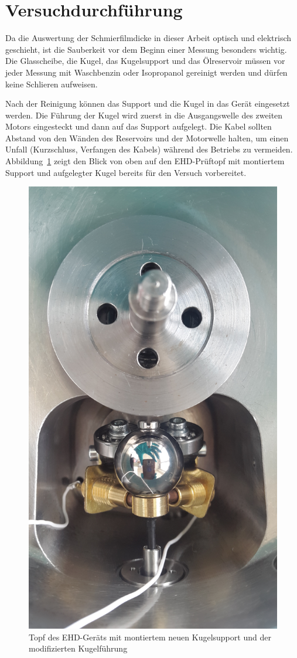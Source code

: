 \section{Versuchdurchführung}
\label{sec:versuchdurchfuehrung}

Da die Auswertung der Schmierfilmdicke in dieser Arbeit optisch und elektrisch geschieht, ist die Sauberkeit vor dem Beginn einer Messung besonders wichtig.
Die Glasscheibe, die Kugel, das Kugelsupport und das Ölreservoir müssen vor jeder Messung mit Waschbenzin oder Isopropanol gereinigt werden und dürfen keine Schlieren aufweisen.

Nach der Reinigung können das Support und die Kugel in das Gerät eingesetzt werden.
Die Führung der Kugel wird zuerst in die Ausgangswelle des zweiten Motors eingesteckt und dann auf das Support aufgelegt.
Die Kabel sollten Abstand von den Wänden des Reservoirs und der Motorwelle halten, um einen Unfall (Kurzschluss, Verfangen des Kabels) während des Betriebs zu vermeiden.
Abbildung~\ref{fig:ehd_topf_mit_kugel_und_support} zeigt den Blick von oben auf den EHD-Prüftopf mit montiertem Support und aufgelegter Kugel bereits für den Versuch vorbereitet.

\begin{figure}[htb]
    \centering
    \includegraphics[width=0.7\linewidth]{./images/ehd_topf_mit_kugel_und_support.jpg}
    \caption{Topf des EHD-Geräts mit montiertem neuen Kugelsupport und der modifizierten Kugelführung}
    \label{fig:ehd_topf_mit_kugel_und_support}
\end{figure}

